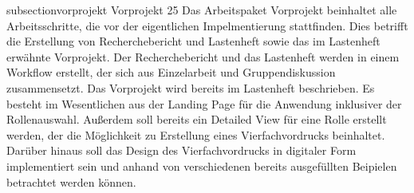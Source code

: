 subsection{vorprojekt}
Vorprojekt 25%
Das Arbeitspaket Vorprojekt beinhaltet alle Arbeitsschritte, die vor der 
eigentlichen Impelmentierung stattfinden. Dies betrifft die Erstellung von 
Recherchebericht und Lastenheft sowie das im Lastenheft erwähnte Vorprojekt. 
Der Recherchebericht und das Lastenheft werden in einem Workflow erstellt, 
der sich aus Einzelarbeit und Gruppendiskussion zusammensetzt. 
Das Vorprojekt wird bereits im Lastenheft beschrieben. Es besteht 
im Wesentlichen aus der Landing Page für die Anwendung inklusiver der 
Rollenauswahl. Außerdem soll bereits ein Detailed View für eine Rolle 
erstellt werden, der die Möglichkeit zu Erstellung eines Vierfachvordrucks 
beinhaltet. Darüber hinaus soll das Design des Vierfachvordrucks in digitaler 
Form implementiert sein und anhand von verschiedenen bereits ausgefüllten 
Beipielen betrachtet werden können.